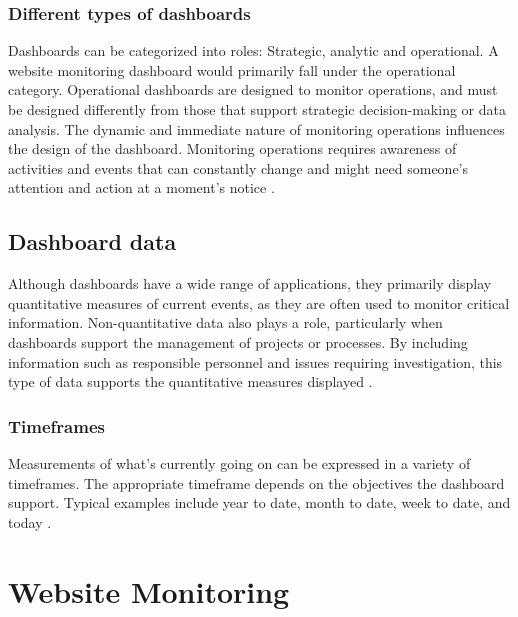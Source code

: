 \subsubsection{Different types of dashboards}
\label{subsubsec:different_types_dashboards}


Dashboards can be categorized into roles: Strategic, analytic and operational. A website monitoring dashboard would primarily fall under the operational category. Operational dashboards are designed to monitor operations, and must be designed differently from those that support strategic decision-making or data analysis. The dynamic and immediate nature of monitoring operations influences the design of the dashboard. Monitoring operations requires awareness of activities and events that can constantly change and might need someone's attention and action at a moment's notice \autocite[p. 31-32]{FewDashboard}.

\subsection{Dashboard data}
\label{subsec:dashboard_data}

Although dashboards have a wide range of applications, they primarily display quantitative measures of current events, as they are often used to monitor critical information. Non-quantitative data also plays a role, particularly when dashboards support the management of projects or processes. By including information such as responsible personnel and issues requiring investigation, this type of data supports the quantitative measures displayed \autocite[p. 33-36]{FewDashboard}.


\subsubsection{Timeframes}
\label{subsubsec:timeframes}


Measurements of what’s currently going on can be expressed in a variety of timeframes. The appropriate timeframe depends on the objectives the dashboard support. Typical examples include year to date, month to date, week to date, and today \autocite[p. 33]{FewDashboard}. 

\section{Website Monitoring}
\label{sec:website_monitoring}

